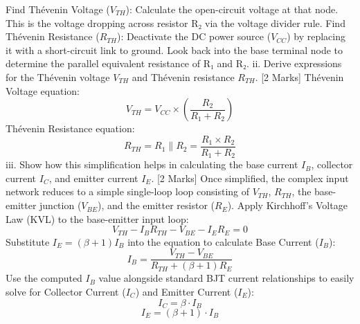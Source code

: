 Find Thévenin Voltage ($V_{TH}$): Calculate the open-circuit voltage at that node. This is the voltage dropping across resistor R₂ via the voltage divider rule.
Find Thévenin Resistance ($R_{TH}$): Deactivate the DC power source ($V_{CC}$) by replacing it with a short-circuit link to ground. Look back into the base terminal node to determine the parallel equivalent resistance of R₁ and R₂.
ii. Derive expressions for the Thévenin voltage $V_{TH}$ and Thévenin resistance $R_{TH}$. [2 Marks]
Thévenin Voltage equation:
$$V_{TH} = V_{CC} \times \left( \frac{R_2}{R_1 + R_2} \right)$$ 
Thévenin Resistance equation:
$$R_{TH} = R_1 \parallel R_2 = \frac{R_1 \times R_2}{R_1 + R_2}$$ 
iii. Show how this simplification helps in calculating the base current $I_B$, collector current $I_C$, and emitter current $I_E$. [2 Marks]
Once simplified, the complex input network reduces to a simple single-loop loop consisting of $V_{TH}$, $R_{TH}$, the base-emitter junction ($V_{BE}$), and the emitter resistor ($R_E$).
Apply Kirchhoff's Voltage Law (KVL) to the base-emitter input loop:
$$V_{TH} - I_B R_{TH} - V_{BE} - I_E R_E = 0$$ 
Substitute $I_E = (\beta + 1)I_B$ into the equation to calculate Base Current ($I_B$):
$$I_B = \frac{V_{TH} - V_{BE}}{R_{TH} + (\beta + 1)R_E}$$
Use the computed $I_B$ value alongside standard BJT current relationships to easily solve for Collector Current ($I_C$) and Emitter Current ($I_E$):
$$I_C = \beta \cdot I_B$$ 
$$I_E = (\beta + 1) \cdot I_B$$ 
